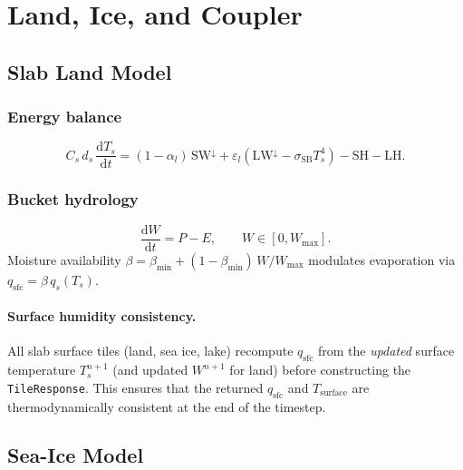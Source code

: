 \documentclass[11pt,a4paper]{article}
\newcommand{\dd}{\mathrm{d}}
\newcommand{\SB}{\sigma_{\mathrm{SB}}}
\begin{document}
\section{Land, Ice, and Coupler}

\subsection{Slab Land Model}

\subsubsection{Energy balance}
\begin{equation}
  C_s\,d_s\,\frac{\dd T_s}{\dd t} = (1-\alpha_l)\,\mathrm{SW}^\downarrow + \varepsilon_l(\mathrm{LW}^\downarrow-\SB T_s^4) - \mathrm{SH} - \mathrm{LH}.
\end{equation}

\subsubsection{Bucket hydrology}
\begin{equation}
  \frac{\dd W}{\dd t} = P - E, \qquad W\in[0,W_{\max}].
\end{equation}
Moisture availability $\beta=\beta_{\min}+(1-\beta_{\min})\,W/W_{\max}$ modulates evaporation via $q_{\mathrm{sfc}}=\beta\,q_s(T_s)$.

\paragraph{Surface humidity consistency.}
All slab surface tiles (land, sea ice, lake) recompute $q_{\mathrm{sfc}}$ from the \emph{updated} surface temperature $T_s^{n+1}$ (and updated $W^{n+1}$ for land) before constructing the \texttt{TileResponse}.  This ensures that the returned $q_{\mathrm{sfc}}$ and $T_{\mathrm{surface}}$ are thermodynamically consistent at the end of the timestep.

\subsection{Sea-Ice Model}
\end{document}
